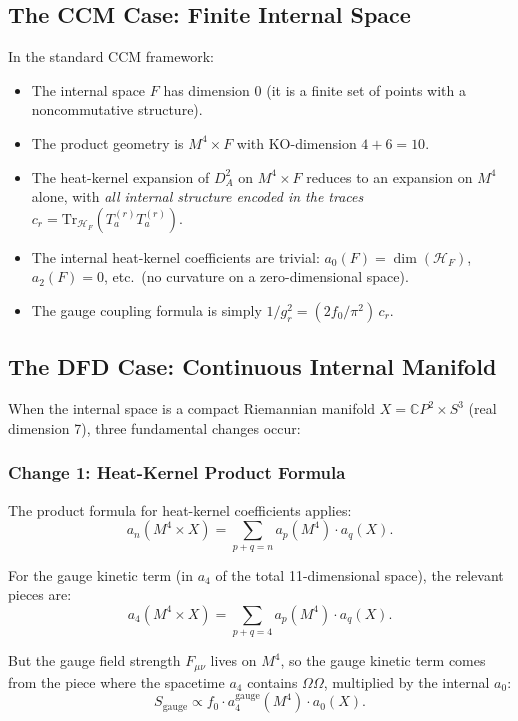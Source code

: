 \documentclass[12pt,a4paper]{article}
\begin{document}
\subsection{The CCM Case: Finite Internal Space}

In the standard CCM framework:
\begin{itemize}[nosep]
\item The internal space $F$ has dimension 0 (it is a finite set of points
  with a noncommutative structure).
\item The product geometry is $M^4 \times F$ with KO-dimension $4 + 6 = 10$.
\item The heat-kernel expansion of $D_A^2$ on $M^4 \times F$ reduces to
  an expansion on $M^4$ alone, with \emph{all internal structure encoded
  in the traces} $c_r = \mathrm{Tr}_{\mathcal{H}_F}(T^{(r)}_a T^{(r)}_a)$.
\item The internal heat-kernel coefficients are trivial: $a_0(F) = \dim(\mathcal{H}_F)$,
  $a_2(F) = 0$, etc.\ (no curvature on a zero-dimensional space).
\item The gauge coupling formula is simply $1/g_r^2 = (2f_0/\pi^2)\,c_r$.
\end{itemize}

\subsection{The DFD Case: Continuous Internal Manifold}

When the internal space is a compact Riemannian manifold
$X = \mathbb{C}P^2 \times S^3$ (real dimension 7), three fundamental
changes occur:

\subsubsection{Change 1: Heat-Kernel Product Formula}

The product formula for heat-kernel coefficients applies:
\begin{equation}\label{eq:product-formula}
a_n(M^4 \times X) = \sum_{p+q=n} a_p(M^4) \cdot a_q(X).
\end{equation}

For the gauge kinetic term (in $a_4$ of the total 11-dimensional space),
the relevant pieces are:
\begin{equation}\label{eq:a4-total-decomp}
a_4(M^4 \times X) = \sum_{p+q=4} a_p(M^4) \cdot a_q(X).
\end{equation}

But the gauge field strength $F_{\mu\nu}$ lives on $M^4$, so the
gauge kinetic term comes from the piece where the spacetime $a_4$ contains
$\Omega\Omega$, multiplied by the internal $a_0$:
\begin{equation}
S_{\mathrm{gauge}} \propto f_0 \cdot
a_4^{\mathrm{gauge}}(M^4) \cdot a_0(X).
\end{equation}
\end{document}
